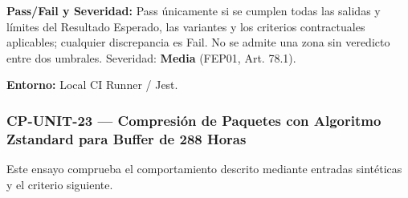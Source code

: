 \par\noindent\textbf{Pass/Fail y Severidad:} Pass únicamente si se cumplen todas las salidas y límites del Resultado Esperado, las variantes y los criterios contractuales aplicables; cualquier discrepancia es Fail. No se admite una zona sin veredicto entre dos umbrales. Severidad: \textbf{Media} (FEP01, Art. 78.1).\par
\par\noindent\textbf{Entorno:} Local CI Runner / Jest.\par






\subsubsection*{CP-UNIT-23 — Compresión de Paquetes con Algoritmo Zstandard para Buffer de 288 Horas}\label{sec:9-cp-unit-23}
Este ensayo comprueba el comportamiento descrito mediante entradas sintéticas y el criterio siguiente.

